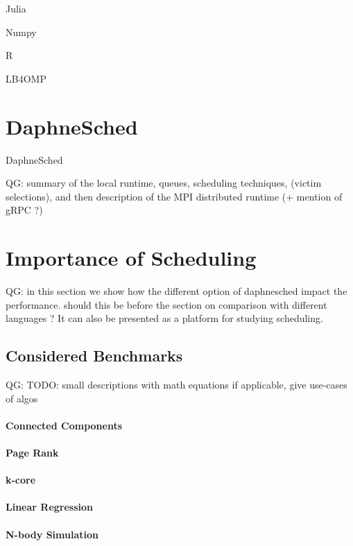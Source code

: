 \documentclass[conference,10pt]{IEEEtran}
\newcommand{\qg}[1]{{\color{blue} QG: #1}} %
\begin{document}
Julia \cite{bezanson2012julia}

Numpy \cite{harris2020array}

R \cite{morandat2012evaluating}

LB4OMP \cite{korndorfer2021lb4omp}

\section{DaphneSched}

DaphneSched \cite{eleliemy2023daphnesched}

\qg{summary of the local runtime, queues, scheduling techniques, (victim selections), and then description of the MPI distributed runtime (+ mention of gRPC ?)}

\section{Importance of Scheduling}

\qg{in this section we show how the different option of daphnesched impact the performance. should this be before the section on comparison with different languages ?
It can also be presented as a platform for studying scheduling.
}

\subsection{Considered Benchmarks}

\qg{TODO: small descriptions with math equations if applicable, give use-cases of algos}

\paragraph{Connected Components}

\paragraph{Page Rank}

\paragraph{k-core}

\paragraph{Linear Regression}

\paragraph{N-body Simulation}
\end{document}
